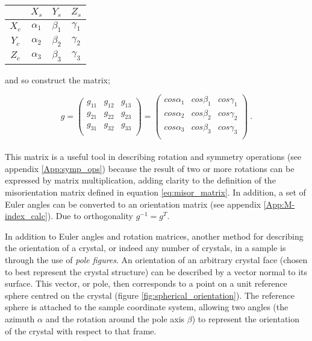 \documentclass[a4paper,12pt,twoside]{report}
\numberwithin{equation}{chapter}
\begin{document}
\begin{table}[h!]
    \centering
	\begin{tabular}{c | c c c}

	  & $X_s$      & $Y_s$      & $Z_s$ \\
\hline
$X_c$ & $\alpha_1$ & $\beta_1$ & $\gamma_1$ \\
$Y_c$ & $\alpha_2$ & $\beta_2$ & $\gamma_2$ \\
$Z_c$ & $\alpha_3$ & $\beta_3$ & $\gamma_3$ \\

	\end{tabular}
\end{table}
\noindent
and so construct the matrix;

\begin{equation}
g = 
\begin{pmatrix}
g_{11} & g_{12} & g_{13} \\
g_{21} & g_{22} & g_{23} \\
g_{31} & g_{32} & g_{33} \\
\end{pmatrix}
= 
\begin{pmatrix}
cos \alpha_1 & cos \beta_1 & cos \gamma_1 \\
cos \alpha_2 & cos \beta_2 & cos \gamma_2 \\
cos \alpha_3 & cos \beta_3 & cos \gamma_3 \\
\end{pmatrix}\ .
\end{equation}
\\
This matrix is a useful tool in describing rotation and symmetry operations (see appendix \ref{App:symp_ops}) because the result of two or more rotations can be expressed by matrix multiplication, adding clarity to the definition of the misorientation matrix defined in equation \ref{eq:misor_matrix}. In addition, a set of Euler angles can be converted to an orientation matrix (see appendix \ref{App:M-index_calc}). Due to orthogonality $g^{-1} = g^T$. 


In addition to Euler angles and rotation matrices, another method for describing the orientation of a crystal, or indeed any number of crystals, in a sample is through the use of \emph{pole figures}. An orientation of an arbitrary crystal face (chosen to best represent the crystal structure) can be described by a vector normal to its surface. This vector, or pole, then corresponds to a point on a unit reference sphere centred on the crystal (figure \ref{fig:spherical_orientation}). The reference sphere is attached to the sample coordinate system, allowing two angles (the azimuth $\alpha$ and the rotation around the pole axis $\beta$) to represent the orientation of the crystal with respect to that frame.  
\end{document}
